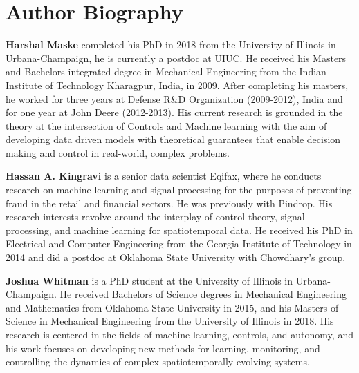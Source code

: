 \documentclass[letterpaper,12pt,peerreviewca,draftcls]{IEEEtran}
\begin{document}
\renewcommand{\thealgorithm}{S\arabic{algorithm}} 
\setcounter{algorithm}{0}

\clearpage


\clearpage


\clearpage





\newpage
\section{Author Biography}

\noindent \textbf{Harshal Maske} completed his PhD in 2018 from the University
of Illinois in Urbana-Champaign, he is currently a postdoc at UIUC. He received his Masters
and Bachelors integrated degree in Mechanical
Engineering from the Indian Institute of Technology
Kharagpur, India, in 2009. After completing his
masters, he worked for three years at Defense R\&D
Organization (2009-2012), India and for one year
at John Deere (2012-2013). His current research is
grounded in the theory at the intersection of Controls
and Machine learning with the aim of developing
data driven models with theoretical guarantees that
enable decision making and control in real-world, complex problems.

\noindent \textbf{Hassan A. Kingravi}  is a senior data scientist Eqifax, where he conducts research on machine
learning and signal processing for the purposes of
preventing fraud in the retail and financial sectors. He was previously with Pindrop.
His research interests revolve around the interplay
of control theory, signal processing, and machine
learning for spatiotemporal data. He received his PhD in Electrical and
Computer Engineering from the Georgia Institute
of Technology in 2014 and did a postdoc at Oklahoma State University with Chowdhary's group.



\noindent \textbf{Joshua Whitman} is a PhD student at the University of Illinois in Urbana-Champaign. He received Bachelors of Science degrees in Mechanical Engineering and Mathematics from Oklahoma State University in 2015, and his Masters of Science in Mechanical Engineering from the University of Illinois in 2018. His research is centered in the fields of machine learning, controls, and autonomy, and his work focuses on developing new methods for learning, monitoring, and controlling the dynamics of complex spatiotemporally-evolving systems.
\end{document}
